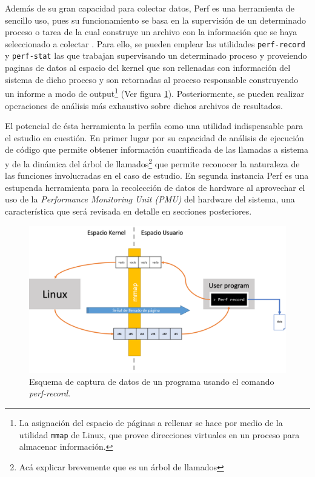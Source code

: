 Además de su gran capacidad para colectar datos, Perf es una herramienta de sencillo uso, pues su funcionamiento se basa en la supervisión de un determinado proceso o tarea de la cual construye un archivo con la información que se haya seleccionado a colectar \cite{article:perf}. Para ello, se pueden emplear las utilidades \verb=perf-record= y \verb=perf-stat= las que trabajan supervisando un determinado proceso y proveiendo paginas de datos al espacio del kernel que son rellenadas con información del sistema de dicho proceso y son retornadas al proceso responsable construyendo un informe a modo de output\footnote{La asignación del espacio de páginas a rellenar se hace por medio de la utilidad \verb=mmap= de Linux, que provee direcciones virtuales en un proceso para almacenar información.} (Ver figura \ref{fig:perfRecord}). Posteriormente, se pueden realizar operaciones de análisis más exhaustivo sobre dichos archivos de resultados.

El potencial de ésta herramienta la perfila como una utilidad indispensable para el estudio en cuestión. En primer lugar por su capacidad de análisis de ejecución de código que permite obtener información cuantificada de las llamadas a sistema y de la dinámica del árbol de llamados\footnote{Acá explicar brevemente que es un árbol de llamados} que permite reconocer la naturaleza de las funciones involucradas en el caso de estudio. En segunda instancia Perf es una estupenda herramienta para la recolección de datos de hardware al aprovechar el uso de la \emph{Performance Monitoring Unit (PMU)} del hardware del sistema, una característica que será revisada en detalle en secciones posteriores.

\begin{figure}[!h]
	\centering
	\includegraphics[scale=.45]{imagenes/perfRecord.png}
	\caption{Esquema de captura de datos de un programa usando el comando \emph{perf-record}.}
	\label{fig:perfRecord}
\end{figure}

